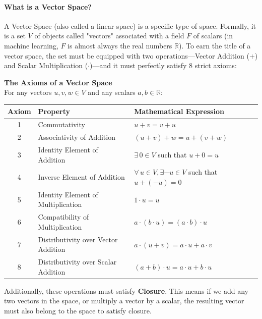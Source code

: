 \documentclass{article}
\begin{document}
\paragraph*{What is a Vector Space?}
A Vector Space (also called a linear space) is a specific type of space. Formally, it is a set $V$ of objects called "vectors" associated with a field $F$ of scalars (in machine learning, $F$ is almost always the real numbers $\mathbb{R}$). To earn the title of a vector space, the set must be equipped with two operations—Vector Addition ($+$) and Scalar Multiplication ($\cdot$)—and it must perfectly satisfy 8 strict axioms:

\vspace{0.5em}
\noindent \textbf{The Axioms of a Vector Space}\\
For any vectors $u, v, w \in V$ and any scalars $a, b \in \mathbb{R}$:

\vspace{1em}
\begin{center}
\renewcommand{\arraystretch}{1.3}
\begin{tabular}{c l l}
\textbf{Axiom} & \textbf{Property} & \textbf{Mathematical Expression} \\
\hline
1 & Commutativity & $u+v=v+u$ \\
2 & Associativity of Addition & $(u+v)+w=u+(v+w)$ \\
3 & Identity Element of Addition & $\exists \, 0 \in V$ such that $u+0=u$ \\
4 & Inverse Element of Addition & $\forall \, u \in V, \exists -u \in V$ such that $u+(-u)=0$ \\
5 & Identity Element of Multiplication & $1 \cdot u = u$ \\
6 & Compatibility of Multiplication & $a \cdot (b \cdot u) = (a \cdot b) \cdot u$ \\
7 & Distributivity over Vector Addition & $a \cdot (u+v) = a \cdot u + a \cdot v$ \\
8 & Distributivity over Scalar Addition & $(a+b) \cdot u = a \cdot u + b \cdot u$ \\
\end{tabular}
\end{center}
\vspace{1em}

Additionally, these operations must satisfy \textbf{Closure}. This means if we add any two vectors in the space, or multiply a vector by a scalar, the resulting vector must also belong to the space to satisfy closure.
\end{document}
